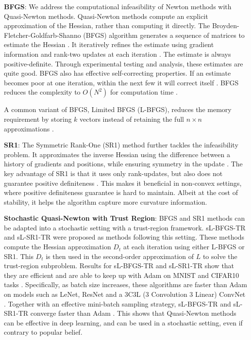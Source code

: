 \textbf{BFGS}: We address the computational infeasibility of Newton methods with Quasi-Newton methods. Quasi-Newton methods compute an explicit approximation of the Hessian, rather than computing it directly. The Broyden-Fletcher-Goldfarb-Shanno (BFGS) algorithm generates a sequence of matrices to estimate the Hessian \citep{NoceWrig06}. It iteratively refines the estimate using gradient information and rank-two updates at each iteration \citep{NoceWrig06}. The estimate is always positive-definite. Through experimental testing and analysis, these estimates are quite good. BFGS also has effective self-correcting properties. If an estimate becomes poor at one iteration, within the next few it will correct itself \citep{NoceWrig06}. BFGS reduces the complexity to $O(N^2)$ for computation time \citep{NoceWrig06, sun2019survey}.  

A common variant of BFGS, Limited BFGS (L-BFGS), reduces the memory requirement by storing $k$ vectors instead of retaining the full $n\times n$ approximations \citep{NoceWrig06, sun2019survey}.

\textbf{SR1}: The Symmetric Rank-One (SR1) method further tackles the infeasibility problem. It approximates the inverse Hessian using the difference between a history of gradients and positions, while ensuring symmetry in the update \citep{NoceWrig06}. The key advantage of SR1 is that it uses only rank-updates, but also does not guarantee positive definiteness \citep{NoceWrig06}. This makes it beneficial in non-convex settings, where positive definiteness guarantee is hard to maintain. Albeit at the cost of stability, it helps the algorithm capture more curvature information.

\textbf{Stochastic Quasi-Newton with Trust Region}: BFGS and SR1 methods can be adapted into a stochastic setting with a trust-region framework. sL-BFGS-TR and sL-SR1-TR were proposed as methods following this setting. These methods compute the Hessian approximation $D_t$ at each iteration using either L-BFGS or SR1. This $D_t$ is then used in the second-order approximation of $L$ to solve the trust-region subproblem. Results for sL-BFGS-TR and sL-SR1-TR show that they are efficient and are able to keep up with Adam on MNIST and CIFAR10 tasks \citep{yousefi2023deep}. Specifically, as batch size increases, these algorithms are faster than Adam on models such as LeNet, ResNet and a 3C3L (3 Convolution 3 Linear) ConvNet \citep{yousefi2023deep}. Together with an effective mini-batch sampling strategy, sL-BFGS-TR and sL-SR1-TR converge faster than Adam \citep{yousefi2023deep}. This shows that Quasi-Newton methods can be effective in deep learning, and can be used in a stochastic setting, even if contrary to popular belief.

